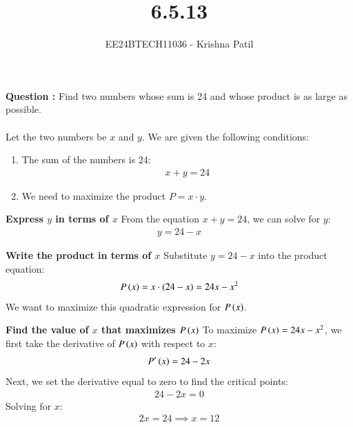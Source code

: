 \documentclass[journal]{IEEEtran}
\begin{document}

\vspace{3cm}

\title{6.5.13}
\author{EE24BTECH11036 - Krishna Patil}
{\let\newpage\relax\maketitle}

\renewcommand{\thefigure}{\theenumi}
\renewcommand{\thetable}{\theenumi}
\setlength{\intextsep}{10pt} %

\renewcommand{\thefigure}{\theenumi}
\renewcommand{\thetable}{\theenumi}
\setlength{\intextsep}{10pt} %

\textbf{Question :}  Find two numbers whose sum is 24 and whose product is as large as possible. \\

\solution \\

Let the two numbers be $ x $ and $ y $. We are given the following conditions:

\begin{enumerate}
    \item The sum of the numbers is 24:
    \begin{align}
        x + y = 24
    \end{align}
    \item We need to maximize the product $ P = x \cdot y $.
\end{enumerate}

\textbf{Express $ y $ in terms of $ x $}  
From the equation $ x + y = 24 $, we can solve for $ y $:
\begin{align}
    y = 24 - x
\end{align}

\textbf{Write the product in terms of $ x $}  
Substitute $ y = 24 - x $ into the product equation:
\begin{align}
    P\left(x\right) = x \cdot \left(24 - x\right) = 24x - x^2
\end{align}
We want to maximize this quadratic expression for $ P\left(x\right) $.

\textbf{Find the value of $ x $ that maximizes $ P\left(x\right) $}  
To maximize $ P\left(x\right) = 24x - x^2 $, we first take the derivative of $ P\left(x\right) $ with respect to $ x $:
\begin{align}
    P{^\prime}\left(x\right) = 24 - 2x
\end{align}
Next, we set the derivative equal to zero to find the critical points:
\begin{align}
    24 - 2x = 0
\end{align}
Solving for $ x $:
\begin{align}
    2x = 24 \implies x = 12
\end{align}
\end{document}
